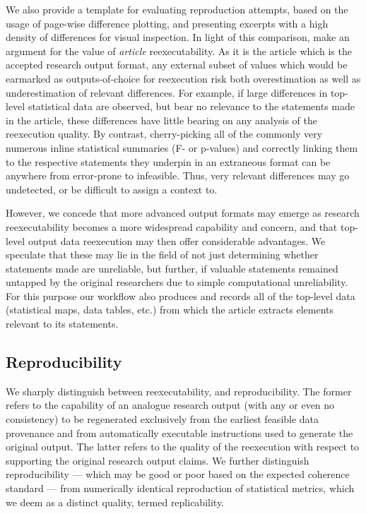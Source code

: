 We also provide a template for evaluating reproduction attempts, based on the usage of page-wise difference plotting, and presenting excerpts with a high density of differences for visual inspection.
In light of this comparison, make an argument for the value of \textit{article} reexecutability.
As it is the article which is the accepted research output format, any external subset of values which would be earmarked as outputs-of-choice for reexecution risk both overestimation as well as underestimation of relevant differences.
For example, if large differences in top-level statistical data are observed, but bear no relevance to the statements made in the article, these differences have little bearing on any analysis of the reexecution quality.
By contrast, cherry-picking all of the commonly very numerous inline statistical summaries (F- or p-values) and correctly linking them to the respective statements they underpin in an extraneous format can be anywhere from error-prone to infeasible.
Thus, very relevant differences may go undetected, or be difficult to assign a context to.

However, we concede that more advanced output formats may emerge as research reexecutability becomes a more widespread capability and concern, and that top-level output data reexecution may then offer considerable advantages.
We speculate that these may lie in the field of not just determining whether statements made are unreliable, but further, if valuable statements remained untapped by the original researchers due to simple computational unreliability.
For this purpose our workflow also produces and records all of the top-level data (statistical maps, data tables, etc.) from which the article extracts elements relevant to its statements.

\subsection{Reproducibility}

We sharply distinguish between reexecutability, and reproducibility.
The former refers to the capability of an analogue research output (with any or even no consistency) to be regenerated exclusively from the earliest feasible data provenance and from automatically executable instructions used to generate the original output.
The latter refers to the quality of the reexecution with respect to supporting the original research output claims.
We further distinguish reproducibility — which may be good or poor based on the expected coherence standard — from numerically identical reproduction of statistical metrics, which we deem as a distinct quality, termed replicability.

